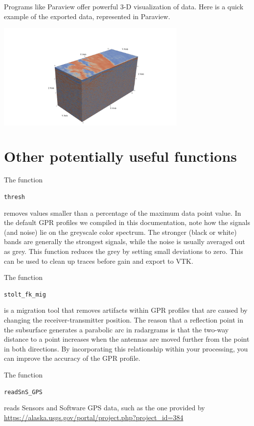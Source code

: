 \documentclass[11pt]{article}
\begin{document}
Programs like Paraview offer powerful 3-D visualization of data.
Here is a quick example of the exported data, represented in Paraview.

\begin{center}
\includegraphics[width=0.7\textwidth, trim = 1cm 3cm 1cm
  3cm,clip]{figures/ParaviewEx.png}
\end{center}

\section{Other potentially useful functions}

The function

\qquad \verb#thresh#

removes values smaller than a percentage of the maximum data point
value. In the default GPR profiles we compiled in this documentation,
note how the signals (and noise) lie on the greyscale color spectrum. The
stronger (black or white) bands are generally the strongest signals,
while the noise is usually averaged out as grey. This function reduces
the grey by setting small deviations to zero. This can be used to 
clean up traces before gain and export to VTK.

The function

\qquad \verb#stolt_fk_mig#

is a migration tool that removes artifacts within GPR profiles that are
caused by changing the receiver-transmitter position. The reason that a
reflection point in the subsurface generates a parabolic arc in radargrams
is that the two-way distance to a point increases when the antennas are moved
further from the point in both directions. By incorporating this relationship
within your processing, you can improve the accuracy of the GPR profile.

The function

\qquad \verb#readSnS_GPS# 

reads Sensors and Software GPS data, such as the one provided by 
\url{https://alaska.usgs.gov/portal/project.php?project_id=384} 
\end{document}

